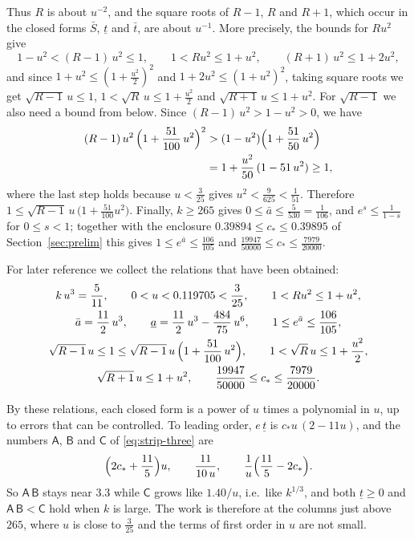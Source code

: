 \documentclass{amsart}
\theoremstyle{definition}
\theoremstyle{remark}
\numberwithin{equation}{section}
\begin{document}
Thus $R$ is about $u^{-2}$, and the square roots of $R-1$, $R$ and $R+1$, which occur in the closed forms $\bar S$, $\underline t$ and $\bar t$, are about $u^{-1}$. More precisely, the bounds for $Ru^2$ give
\[
1-u^2<(R-1)\,u^2\le 1,\qquad 1<Ru^2\le 1+u^2,\qquad(R+1)\,u^2\le 1+2u^2,
\]
and since $1+u^2\le(1+\frac{u^2}{2})^2$ and $1+2u^2\le(1+u^2)^2$, taking square roots we get $\sqrt{R-1}\,u\le 1$, $1<\sqrt R\,u\le 1+\frac{u^2}{2}$ and $\sqrt{R+1}\,u\le 1+u^2$. For $\sqrt{R-1}$ we also need a bound from below. Since $(R-1)\,u^2>1-u^2>0$, we have
\begin{align*}
(R-1)\,u^2\,\Bigl(1+\frac{51}{100}\,u^2\Bigr)^2&>(1-u^2)\Bigl(1+\frac{51}{50}\,u^2\Bigr)\\
&=1+\frac{u^2}{50}\,(1-51\,u^2)\ge 1,
\end{align*}
where the last step holds because $u<\frac{3}{25}$ gives $u^2<\frac{9}{625}<\frac{1}{51}$. Therefore $1\le\sqrt{R-1}\,u\,\bigl(1+\frac{51}{100}u^2\bigr)$. Finally, $k\ge 265$ gives $0\le\bar a\le\frac{5}{530}=\frac{1}{106}$, and $e^s\le\frac{1}{1-s}$ for $0\le s<1$; together with the enclosure $0.39894\le c_\ast\le 0.39895$ of Section~\ref{sec:prelim} this gives $1\le e^{\bar a}\le\frac{106}{105}$ and $\frac{19947}{50000}\le c_\ast\le\frac{7979}{20000}$.

For later reference we collect the relations that have been obtained:
\begin{equation}\label{eq:strip-relations}
\begin{gathered}
k\,u^3=\frac{5}{11},\qquad 0<u<0.119705<\frac{3}{25},\qquad 1<Ru^2\le 1+u^2,\\
\bar a=\frac{11}{2}\,u^3,\qquad\underline a=\frac{11}{2}\,u^3-\frac{484}{75}\,u^6,\qquad 1\le e^{\bar a}\le\frac{106}{105},\\
\sqrt{R-1}\,u\le 1\le\sqrt{R-1}\,u\,\Bigl(1+\frac{51}{100}\,u^2\Bigr),\qquad 1<\sqrt R\,u\le 1+\frac{u^2}{2},\\
\sqrt{R+1}\,u\le 1+u^2,\qquad\frac{19947}{50000}\le c_\ast\le\frac{7979}{20000}.
\end{gathered}
\end{equation}

By these relations, each closed form is a power of $u$ times a polynomial in $u$, up to errors that can be controlled. To leading order, $e\,\underline t$ is $c_\ast u\,(2-11u)$, and the numbers $\mathsf{A}$, $\mathsf{B}$ and $\mathsf{C}$ of \eqref{eq:strip-three} are
\[
\Bigl(2c_\ast+\frac{11}{5}\Bigr)u,\qquad\frac{11}{10\,u},\qquad\frac{1}{u}\Bigl(\frac{11}{5}-2c_\ast\Bigr).
\]
So $\mathsf{A}\,\mathsf{B}$ stays near $3.3$ while $\mathsf{C}$ grows like $1.40/u$, i.e.\ like $k^{1/3}$, and both $\underline t\ge 0$ and $\mathsf{A}\,\mathsf{B}<\mathsf{C}$ hold when $k$ is large. The work is therefore at the columns just above $265$, where $u$ is close to $\frac{3}{25}$ and the terms of first order in $u$ are not small.
\end{document}
